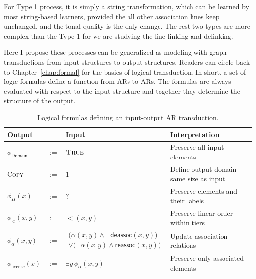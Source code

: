 For Type 1 process, it is simply a string transformation, which can be
learned by most string-based learners, provided the all other
association lines keep unchanged, and the tonal quality is the only
change. The rest two types are more complex than the Type 1 for we are
studying the line linking and delinking.

Here I propose these processes can be generalized as modeling with graph
transductions from input structures to output structures.
Readers can circle back to Chapter~\ref{chap:formal} for the basics of
logical transduction. In short, a set of logic formulas define a
function from ARs to ARs. The formulas are always evaluated with respect
to the input structure and together they determine the structure of the
output.



\begin{table}[t]
	\centering
	\small
	\begin{tabular}{llll}
		\toprule
		\textbf{Output} & & \textbf{Input} & \textbf{Interpretation} \\
		\midrule
		$\phi_{\textsf{Domain}}$ & $:=$ & $\textsc{True}$
		& Preserve all input elements \\[0.5em]
		\textsc{Copy} & $:=$ & 1
		& Define output domain same size as input \\[0.5em]
		$\phi_{H}(x)$ & $:=$ & $?$
		& Preserve elements and their labels \\[0.5em]
		$\phi_{<}(x,y)$ & $:=$ & $<(x,y)$
		& Preserve linear order within tiers \\[0.5em]
		$\phi_{\alpha}(x,y)$ & $:=$
		& $\begin{aligned}
			\bigl(\alpha(x,y) \land \neg \textsf{deassoc}(x,y)\bigr)\\
			\lor \bigl(\neg \alpha(x,y) \land \textsf{reassoc}(x,y)\bigr)
		\end{aligned}$
		& Update association relations \\[0.5em]
		$\phi_{\textsf{license}}(x)$ & $:=$ & $\exists y\, \phi_\alpha(x,y)$
		& Preserve only associated elements \\
		\bottomrule
	\end{tabular}
	\caption{Logical formulas defining an input-output AR transduction.}
	\label{tab.transduction}
\end{table}

